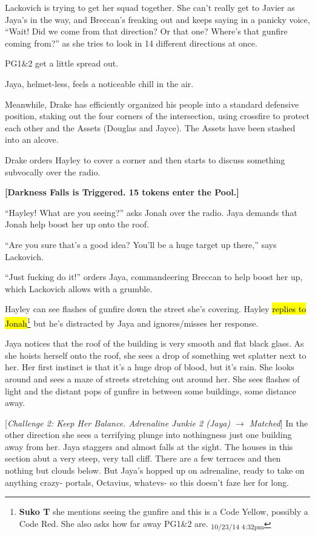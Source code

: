 Lackovich is trying to get her squad together.  She can't really get to Javier as Jaya's in the way, and Breccan's freaking out and keeps saying in a panicky voice, ``Wait!  Did we come from that direction?  Or that one?  Where's that gunfire coming from?'' as she tries to look in 14 different directions at once.

PG1\&2 get a little spread out.

Jaya, helmet-less, feels a noticeable chill in the air.



Meanwhile, Drake has efficiently organized his people into a standard defensive position, staking out the four corners of the intersection, using crossfire to protect each other and the Assets (Douglas and Jayce).  The Assets have been stashed into an alcove.

Drake orders Hayley to cover a corner and then starts to discuss something subvocally over the radio.



\textbf{{[}Darkness Falls is Triggered.  15 tokens enter the Pool.{]}}



``Hayley! What are you seeing?'' asks Jonah over the radio.  Jaya demands that Jonah help boost her up onto the roof.  

``Are you sure that's a good idea?  You'll be a huge target up there,'' says Lackovich.

``Just fucking do it!'' orders Jaya, commandeering Breccan to help boost her up, which Lackovich allows with a grumble.  



Hayley can see flashes of gunfire down the street she's covering.  Hayley \hl{replies to Jonah}\footnote{\textbf{Suko T }she mentions seeing the gunfire and this is a Code Yellow, possibly a Code Red.  She also asks how far away PG1\&2 are. \textsubscript{10/23/14 4:32pm}} but he's distracted by Jaya and ignores/misses her response.



Jaya notices that the roof of the building is very smooth and flat black glass.  As she hoists herself onto the roof, she sees a drop of something wet splatter next to her.  Her first instinct is that it's a huge drop of blood, but it's rain. She looks around and sees a maze of streets stretching out around her. She sees flashes of light and the distant pops of gunfire in between some buildings, some distance away.

{[}\textit{Challenge 2: Keep Her Balance.  Adrenaline Junkie 2 (Jaya) $\rightarrow$ Matched}{]}  In the other direction she sees a terrifying plunge into nothingness just one building away from her.  Jaya staggers and almost falls at the sight.  The houses in this section abut a very steep, very tall cliff.  There are a few terraces and then nothing but clouds below.  But Jaya's hopped up on adrenaline, ready to take on anything crazy- portals, Octavius, whatevs- so this doesn't faze her for long.



